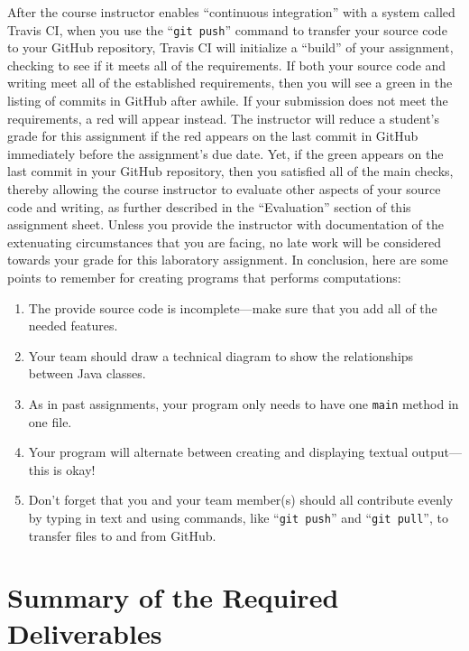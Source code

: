 \documentclass[11pt]{article}
\newcommand{\gitpush}{\command{git push}}
\newcommand{\command}[1]{``\lstinline{#1}''}
\newcommand{\step}[1]{``{#1}''}
\newcommand{\checkmark}{\ding{51}}
\newcommand{\naughtmark}{\ding{55}}
\begin{document}
After the course instructor enables \step{continuous integration} with a system called Travis CI, when you use the
\gitpush{} command to transfer your source code to your GitHub repository, Travis CI will initialize a \step{build} of
your assignment, checking to see if it meets all of the requirements. If both your source code and writing meet all of
the established requirements, then you will see a green \checkmark{} in the listing of commits in GitHub after awhile.
If your submission does not meet the requirements, a red \naughtmark{} will appear instead. The instructor will reduce a
student's grade for this assignment if the red \naughtmark{} appears on the last commit in GitHub immediately before the
assignment's due date. Yet, if the green \checkmark{} appears on the last commit in your GitHub repository, then you
satisfied all of the main checks, thereby allowing the course instructor to evaluate other aspects of your source code
and writing, as further described in the \step{Evaluation} section of this assignment sheet. Unless you provide the
instructor with documentation of the extenuating circumstances that you are facing, no late work will be considered
towards your grade for this laboratory assignment. In conclusion, here are some points to remember for creating programs
that performs computations:

\begin{enumerate}
  \setlength{\itemsep}{0pt}

\item The provide source code is incomplete---make sure that you add all of the needed features.

\item Your team should draw a technical diagram to show the relationships between Java classes.

\item As in past assignments, your program only needs to have one {\tt main} method in one file.

\item Your program will alternate between creating and displaying textual output---this is okay!

\item Don't forget that you and your team member(s) should all contribute evenly by typing in text and using commands,
  like \command{git push} and \command{git pull}, to transfer files to and from GitHub.

\end{enumerate}

\section*{Summary of the Required Deliverables}
\end{document}
